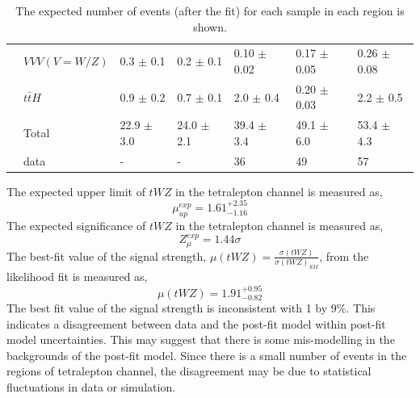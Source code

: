 \begin{table}[h!]
{\begin{tabular}{|l|l|l|l|l|l|l|}
                        & $VVV (V = W/Z)$          & 0.3 $\pm$ 0.1     & 0.2 $\pm$ 0.1    & 0.10 $\pm$ 0.02     & 0.17 $\pm$ 0.05      & 0.26 $\pm$ 0.08  \\
                        & $t\bar{t}H$           & 0.9 $\pm$ 0.2       & 0.7 $\pm$ 0.1     & 2.0 $\pm$ 0.4      & 0.20 $\pm$ 0.03      & 2.2 $\pm$ 0.5     \\\hline
                        & Total         & 22.9 $\pm$ 3.0         & 24.0 $\pm$ 2.1       & 39.4 $\pm$ 3.4         & 49.1 $\pm$ 6.0         & 53.4 $\pm$ 4.3      \\ \hline
                        & data          & -                                         & -                                      & 36                                         & 49                                         & 57                                      \\ \hline
\end{tabular}}
\caption{The expected number of events (after the fit) for each sample in each region is shown.}
\label{tab:4Lep-PostFit-Yields}
\end{table}
The expected upper limit of $tWZ$ in the tetralepton channel is measured as,
\begin{equation}
  \mu_{up}^{exp} =   1.61^{+2.35}_{-1.16}
\end{equation}
The expected significance of $tWZ$ in the tetralepton channel is measured as,
\begin{equation}
 Z_{\mu}^{exp} = 1.44\sigma
\end{equation}
The best-fit value of the signal strength, $\mu (tWZ)= \frac{\sigma(tWZ)}{\sigma(tWZ)_{SM}}$, from the likelihood fit is measured as,
\begin{equation}
  \mu (tWZ) =   1.91^{+0.95}_{-0.82}
\end{equation}
The best fit value of the signal strength is inconsistent with 1 by $9\%$. This indicates a disagreement between data and the post-fit model within post-fit model uncertainties. This may suggest that there is some mis-modelling in the backgrounds of the post-fit model. Since there is a small number of events in the regions of tetralepton channel, the disagreement may be due to statistical fluctuations in data or simulation.\\

